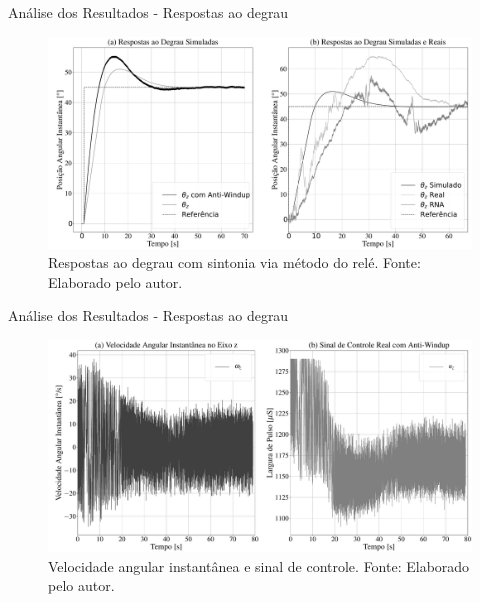 \documentclass{beamer}
\begin{document}

\begin{frame}{Análise dos Resultados - Respostas ao degrau}
     \begin{figure}[HT]
		\begin{center}
		\captionsetup{justification=centering}
        \includegraphics[scale=.18]{../resultados/img/pid_result}
        \caption{Respostas ao degrau com sintonia via método do relé. \newline
        		 Fonte: Elaborado pelo autor.}
		\label{FIG_ADAPTATIVO}
        \end{center}
	\end{figure}
\end{frame}


\begin{frame}{Análise dos Resultados - Respostas ao degrau}
     \begin{figure}[HT]
		\begin{center}
		\captionsetup{justification=centering}
        \includegraphics[scale=.18]{../resultados/img/pid_result_controller}
        \caption{Velocidade angular instantânea e sinal de controle. \newline
        		 Fonte: Elaborado pelo autor.}
		\label{FIG_ADAPTATIVO}
        \end{center}
	\end{figure}
\end{frame}
\end{document}
